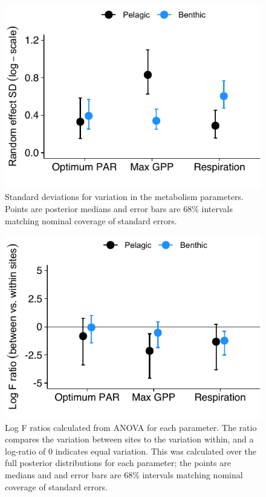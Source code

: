 \documentclass[12pt]{article}
\begin{document}
{\begin{figure}
\centering
\linespread{1}
\includegraphics{../analysis/figures/fig_sd.pdf}
\caption{\label{fig:sd}
Standard deviations for variation in the metabolism parameters.
Points are posterior medians 
and error bars are 68\% intervals matching nominal coverage of standard errors.
}
\end{figure}

\clearpage


\begin{figure}
\centering
\linespread{1}
\includegraphics{../analysis/figures/fig_var.pdf}
\caption{\label{fig:var}
Log F ratios calculated from ANOVA for each parameter.
The ratio compares the variation between sites to the variation within,
and a log-ratio of 0 indicates equal variation. 
This was calculated over the full posterior distributions for each parameter;
the points are medians and 
and error bars are 68\% intervals matching nominal coverage of standard errors.
}
\end{figure}

}
\end{document}
